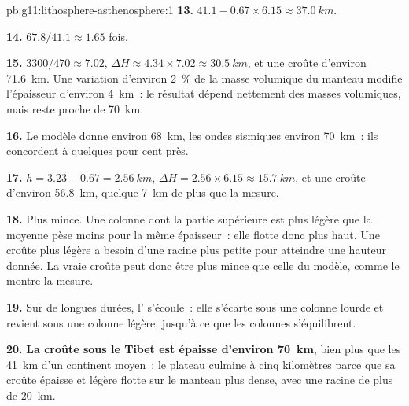 \begin{solution}{pb:g11:lithosphere-asthenosphere:1}
\textbf{13.} $41.1 - 0.67 \times 6.15 \approx \qty{37.0}{km}$.

\textbf{14.} $67.8/41.1 \approx 1.65$ fois.

\textbf{15.} $3300/470 \approx 7.02$, $\Delta H \approx 4.34 \times 7.02
\approx \qty{30.5}{km}$, et une croûte d'environ \qty{71.6}{km}. Une
variation d'environ \qty{2}{\percent} de la masse volumique du manteau
modifie l'épaisseur d'environ \qty{4}{km}~: le résultat dépend nettement des
masses volumiques, mais reste proche de \qty{70}{km}.

\textbf{16.} Le modèle donne environ \qty{68}{km}, les ondes sismiques
environ \qty{70}{km}~: ils concordent à quelques pour cent près.

\textbf{17.} $h = 3.23 - 0.67 = \qty{2.56}{km}$, $\Delta H = 2.56 \times
6.15 \approx \qty{15.7}{km}$, et une croûte d'environ \qty{56.8}{km},
quelque \qty{7}{km} de plus que la mesure.

\textbf{18.} Plus mince. Une colonne dont la partie supérieure est plus
légère que la moyenne pèse moins pour la même épaisseur~: elle flotte donc
plus haut. Une croûte plus légère a besoin d'une racine plus petite pour
atteindre une hauteur donnée. La vraie croûte peut donc être plus mince que
celle du modèle, comme le montre la mesure.

\textbf{19.} Sur de longues durées, l' s'écoule~: elle s'écarte
sous une colonne lourde et revient sous une colonne légère, jusqu'à ce que
les colonnes s'équilibrent.

\textbf{20.} \textbf{La croûte sous le Tibet est épaisse d'environ
\qty{70}{km}}, bien plus que les \qty{41}{km} d'un continent moyen~: le
plateau culmine à cinq kilomètres parce que sa croûte épaisse et légère
flotte sur le manteau plus dense, avec une racine de plus de \qty{20}{km}.
\end{solution}
